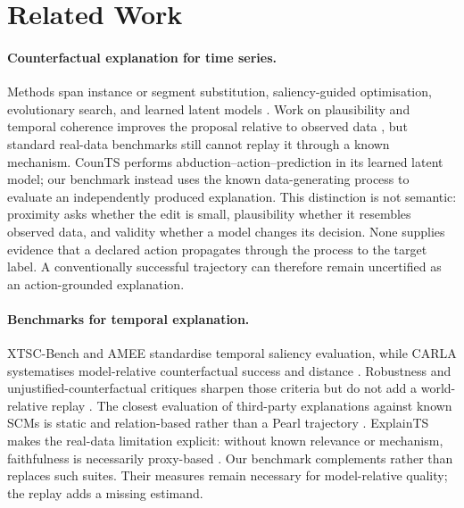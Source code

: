 \documentclass{article}
\begin{document}
\section{Related Work}

\paragraph{Counterfactual explanation for time series.}
Methods span instance or segment substitution, saliency-guided optimisation, evolutionary search, and learned latent models \citep{delaney2021nativeguide,ates2021comte,hollig2022tsevo,li2024mcels,paredescetina2025confetti,yan2023counts}.  Work on plausibility and temporal coherence improves the proposal relative to observed data \citep{kostrzewa2026plausibility,zuin2026navigating,voets2026contex}, but standard real-data benchmarks still cannot replay it through a known mechanism.  CounTS performs abduction--action--prediction in its learned latent model; our benchmark instead uses the known data-generating process to evaluate an independently produced explanation. This distinction is not semantic: proximity asks whether the edit is small, plausibility whether it resembles observed data, and validity whether a model changes its decision. None supplies evidence that a declared action propagates through the process to the target label. A conventionally successful trajectory can therefore remain uncertified as an action-grounded explanation.

\paragraph{Benchmarks for temporal explanation.}
XTSC-Bench and AMEE standardise temporal saliency evaluation, while CARLA systematises model-relative counterfactual success and distance \citep{hollig2023xtscbench,nguyen2024amee,pawelczyk2021carla}.  Robustness and unjustified-counterfactual critiques sharpen those criteria but do not add a world-relative replay \citep{ghorbani2019fragile,yeh2019infidelity,laugel2019dangers,poyiadzi2020face}.  The closest evaluation of third-party explanations against known SCMs is static and relation-based rather than a Pearl trajectory \citep{hollig2023semantic}. ExplainTS makes the real-data limitation explicit: without known relevance or mechanism, faithfulness is necessarily proxy-based \citep{mozolewski2026explaints}. Our benchmark complements rather than replaces such suites.  Their measures remain necessary for model-relative quality; the replay adds a missing estimand.
\end{document}
